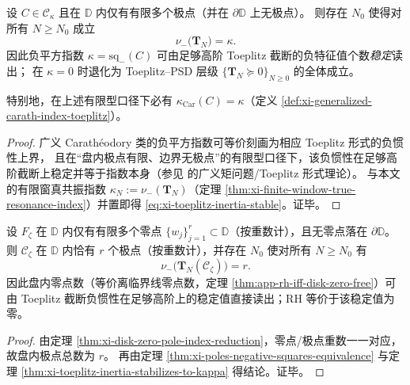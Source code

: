 \begin{theorem}\label{thm:xi-toeplitz-inertia-stabilizes-to-kappa}
设 \(C\in\mathcal{C}_{\kappa}\) 且在 \(\mathbb{D}\) 内仅有有限多个极点（并在 \(\partial\mathbb{D}\) 上无极点）。
则存在 \(N_0\) 使得对所有 \(N\ge N_0\) 成立
\begin{equation}\label{eq:xi-toeplitz-inertia-stable}
\boxed{\;
\nu_-\!\bigl(\mathbf{T}_N\bigr)=\kappa. \;}
\end{equation}
因此负平方指数 \(\kappa=\mathrm{sq}_-(C)\) 可由足够高阶 Toeplitz 截断的负特征值个数\emph{稳定}读出；
在 \(\kappa=0\) 时退化为 Toeplitz--PSD 层级 \(\{\mathbf{T}_N\succeq 0\}_{N\ge 0}\) 的全体成立。
\par
特别地，在上述有限型口径下必有 \(\kappa_{\mathrm{Car}}(C)=\kappa\)（定义 \ref{def:xi-generalized-carath-index-toeplitz}）。
\end{theorem}

\begin{proof}
广义 Carath\'eodory 类的负平方指数可等价刻画为相应 Toeplitz 形式的负惯性上界，
且在“盘内极点有限、边界无极点”的有限型口径下，该负惯性在足够高阶截断上稳定并等于指数本身（参见 \cite{KreinLanger1977ExtensionPiKappaI,AlpayDijksmaRovnyakDeSnoo1997SchurPontryagin} 的广义矩问题/Toeplitz 形式理论）。
与本文的有限窗真共振指数 \(\kappa_N:=\nu_-(\mathbf{T}_N)\)（定理 \ref{thm:xi-finite-window-true-resonance-index}）并置即得 \eqref{eq:xi-toeplitz-inertia-stable}。证毕。
\end{proof}

\begin{corollary}\label{cor:xi-inertia-stable-counts-disk-zeros}
设 \(F_{\zeta}\) 在 \(\mathbb{D}\) 内仅有有限多个零点 \(\{w_j\}_{j=1}^{r}\subset\mathbb{D}\)（按重数计），且无零点落在 \(\partial\mathbb{D}\)。
则 \(\mathscr{C}_{\zeta}\) 在 \(\mathbb{D}\) 内恰有 \(r\) 个极点（按重数计），并存在 \(N_0\) 使对所有 \(N\ge N_0\) 有
\[
\boxed{\;
\nu_-\!\bigl(\mathbf{T}_N(\mathscr{C}_{\zeta})\bigr)=r. \;}
\]
因此盘内零点数（等价离临界线零点数，定理 \ref{thm:app-rh-iff-disk-zero-free}）可由 Toeplitz 截断负惯性在足够高阶上的稳定值直接读出；RH 等价于该稳定值为零。
\end{corollary}

\begin{proof}
由定理 \ref{thm:xi-disk-zero-pole-index-reduction}，零点/极点重数一一对应，故盘内极点总数为 \(r\)。
再由定理 \ref{thm:xi-poles-negative-squares-equivalence} 与定理 \ref{thm:xi-toeplitz-inertia-stabilizes-to-kappa} 得结论。证毕。
\end{proof}

